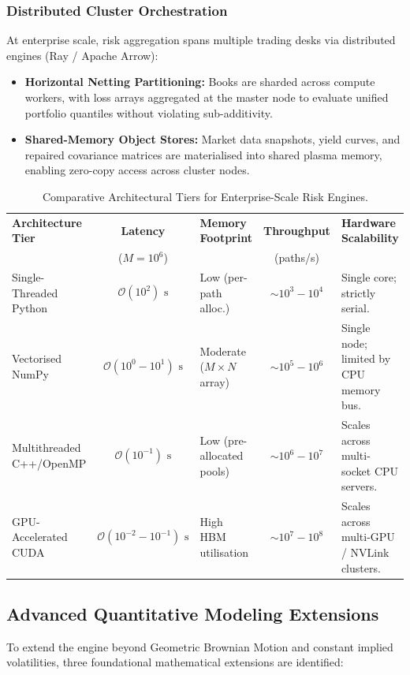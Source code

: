 \documentclass{article}
\theoremstyle{plain}
\theoremstyle{definition}
\theoremstyle{remark}
\begin{document}
\subsubsection{Distributed Cluster Orchestration}
At enterprise scale, risk aggregation spans multiple trading desks via distributed engines (Ray / Apache Arrow):
\begin{itemize}
    \item \textbf{Horizontal Netting Partitioning:} Books are sharded across compute workers, with loss arrays aggregated at the master node to evaluate unified portfolio quantiles without violating sub-additivity.
    \item \textbf{Shared-Memory Object Stores:} Market data snapshots, yield curves, and repaired covariance matrices are materialised into shared plasma memory, enabling zero-copy access across cluster nodes.
\end{itemize}

\begin{table}[htbp]
\centering
\small
\setlength{\tabcolsep}{4pt}
\caption{Comparative Architectural Tiers for Enterprise-Scale Risk Engines.}
\label{tab:hpc_tiers}
\begin{tabularx}{\textwidth}{@{} l c l c >{\raggedright\arraybackslash}X @{}}
\toprule
\textbf{Architecture Tier} & \textbf{Latency} & \textbf{Memory Footprint} & \textbf{Throughput} & \textbf{Hardware Scalability} \\
 & ($M=10^6$) & & (paths/s) & \\
\midrule
Single-Threaded Python & $\mathcal{O}(10^2)\text{ s}$ & Low (per-path alloc.) & $\sim 10^3 - 10^4$ & Single core; strictly serial. \\
\addlinespace
Vectorised NumPy & $\mathcal{O}(10^0 - 10^1)\text{ s}$ & Moderate ($M \times N$ array) & $\sim 10^5 - 10^6$ & Single node; limited by CPU memory bus. \\
\addlinespace
Multithreaded C++/OpenMP & $\mathcal{O}(10^{-1})\text{ s}$ & Low (pre-allocated pools) & $\sim 10^6 - 10^7$ & Scales across multi-socket CPU servers. \\
\addlinespace
GPU-Accelerated CUDA & $\mathcal{O}(10^{-2} - 10^{-1})\text{ s}$ & High HBM utilisation & $\sim 10^7 - 10^8$ & Scales across multi-GPU / NVLink clusters. \\
\bottomrule
\end{tabularx}
\end{table}

\subsection{Advanced Quantitative Modeling Extensions}
\label{sec:ch5_extensions}
To extend the engine beyond Geometric Brownian Motion and constant implied volatilities, three foundational mathematical extensions are identified:
\end{document}
